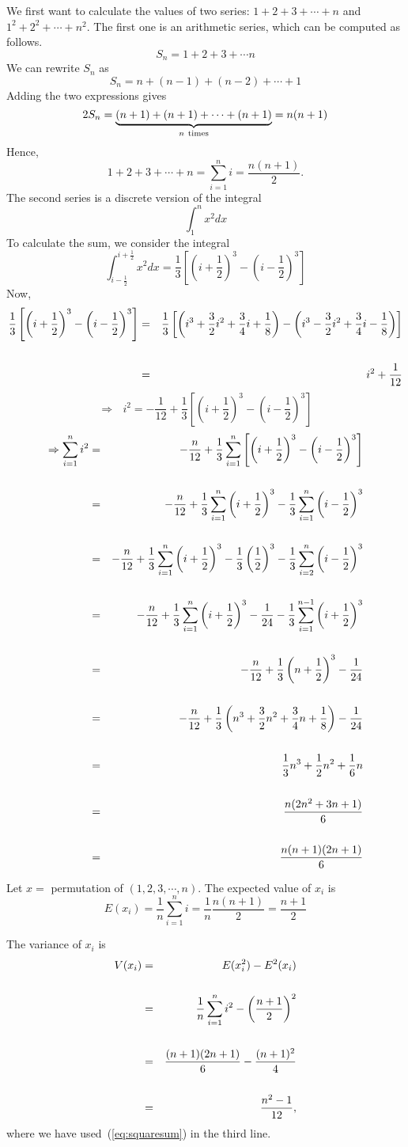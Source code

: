\documentclass[11pt]{article}
\newcommand{\beq}{\begin{equation}}
\newcommand{\eeq}{\end{equation}}
\newcommand{\beqn}{\begin{eqnarray}}
\newcommand{\eeqn}{\end{eqnarray}}
\numberwithin{equation}{section}
\begin{document}
We first want to calculate the values of two series: $1+2+3+\cdots + n$ and 
$1^2 + 2^2 + \cdots + n^2$. The first one is an arithmetic series, which can be 
computed as follows. 
\[
  S_n = 1+2+3+\cdots n 
\]
We can rewrite $S_n$ as 
\[
  S_n = n + (n-1) + (n-2) + \cdots + 1 
\]
Adding the two expressions gives 
\[
  2 S_n = \underbrace{(n+1) + (n+1) + \cdots + (n+1)}_{n\ {\rm times}} = n(n+1)
\]
Hence, 
\beq
  1+2+3+\cdots + n = \sum_{i=1}^n i = \frac{n(n+1)}{2} .
\label{eq:arithmetic}
\eeq
The second series is a discrete version of the integral 
\[
  \int_1^n x^2 dx 
\]
To calculate the sum, we consider the integral 
\[
  \int_{i-\frac{1}{2}}^{i+\frac{1}{2}} x^2 dx = \frac{1}{3} \left[ \left(i + \frac{1}{2}\right)^3 
- \left(i - \frac{1}{2}\right)^3 \right]  
\]
Now, 
\beqn
  \frac{1}{3} \left[ \left(i + \frac{1}{2}\right)^3 
- \left(i - \frac{1}{2}\right)^3 \right] &=& \frac{1}{3} \left[ \left( i^3 + \frac{3}{2}i^2 
+ \frac{3}{4}i + \frac{1}{8}\right) - \left( i^3 - \frac{3}{2}i^2 + \frac{3}{4}i - \frac{1}{8}\right) \right] 
\cr \cr 
&=& i^2+ \frac{1}{12} \nonumber
\eeqn
\[
 \Rightarrow \ \ \ i^2 = -\frac{1}{12} + \frac{1}{3} \left[ \left(i + \frac{1}{2}\right)^3
- \left(i - \frac{1}{2}\right)^3 \right]
\]
\beqn
  \Rightarrow \sum_{i=1}^n i^2 &=& -\frac{n}{12} + \frac{1}{3} \sum_{i=1}^n 
\left[ \left(i + \frac{1}{2}\right)^3 - \left(i - \frac{1}{2}\right)^3 \right] \cr \cr 
&=& -\frac{n}{12} + \frac{1}{3} \sum_{i=1}^n \left(i + \frac{1}{2}\right)^3 
- \frac{1}{3} \sum_{i=1}^n \left(i - \frac{1}{2}\right)^3 \cr \cr 
&=& -\frac{n}{12} + \frac{1}{3} \sum_{i=1}^n \left(i + \frac{1}{2}\right)^3 
- \frac{1}{3} \left(\frac{1}{2}\right)^3 - \frac{1}{3} \sum_{i=2}^n \left(i - \frac{1}{2}\right)^3 \cr \cr
&=& -\frac{n}{12} + \frac{1}{3} \sum_{i=1}^n \left(i + \frac{1}{2}\right)^3 
- \frac{1}{24} - \frac{1}{3} \sum_{i=1}^{n-1} \left(i + \frac{1}{2}\right)^3 \cr \cr 
&=& -\frac{n}{12} + \frac{1}{3} \left(n+\frac{1}{2}\right)^3 - \frac{1}{24} \cr \cr 
&=& -\frac{n}{12} + \frac{1}{3} \left(n^3 + \frac{3}{2}n^2 + \frac{3}{4}n + \frac{1}{8}\right) - \frac{1}{24} \cr \cr
&=& \frac{1}{3}n^3 + \frac{1}{2}n^2 + \frac{1}{6}n \cr \cr 
&=& \frac{n(2n^2+3n+1)}{6} \cr \cr 
&=& \frac{n(n+1)(2n+1)}{6} 
\label{eq:squaresum}
\eeqn

Let $x =$ permutation of $(1,2,3,\cdots, n)$. The expected value of $x_i$ is 
\beq
  E(x_i) =\frac{1}{n} \sum_{i=1}^n i = \frac{1}{n} \frac{n(n+1)}{2} = \frac{n+1}{2} 
\label{eq:Expxi}
\eeq

The variance of $x_i$ is 
\beqn
  V(x_i) &=& E(x_i^2) - E^2(x_i) \cr \cr 
&=& \frac{1}{n} \sum_{i=1}^n i^2 - \left( \frac{n+1}{2}\right)^2 \cr \cr 
&=& \frac{(n+1)(2n+1)}{6} - \frac{(n+1)^2}{4} \cr \cr 
&=& \frac{n^2-1}{12} ,
\label{eq:Vxi}
\eeqn
where we have used~(\ref{eq:squaresum}) in the third line.
\end{document}
